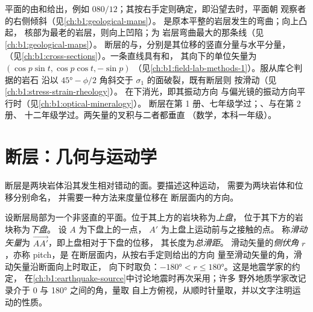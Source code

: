 \begin{recall}
平面的由和给出，例如
$080/12$；其按右手定则确定，即沿望去时，平面朝
观察者的右侧倾斜（见\cref{ch:b1:geological-maps}）。
是原本平整的岩层发生的弯曲；向上凸起，
核部为最老的岩层，则向上凹陷；为
岩层弯曲最大的那条线（见\cref{ch:b1:geological-maps}）。
断层的与，分别是其位移的竖直分量与水平分量，
（见\cref{ch:b1:cross-sections}）。一条直线具有和，
其向下的单位矢量为 $(\cos p\sin t, \cos p\cos t, -\sin p)$
（见\cref{ch:b1:field-lab-methods-1}）。服从库仑判据的岩石
沿以 $\ang{45} - \phi/2$ 角斜交于 $\sigma_1$ 的面破裂，既有断层则
按滑动（见\cref{ch:b1:stress-strain-rheology}）。
在下消光，即其振动方向
与偏光镜的振动方向平行时（见\cref{ch:b1:optical-mineralogy}）。
断层在第 1 册、七年级学过；、与在第 2 册、
十二年级学过。两矢量的叉积与二者都垂直
（数学，本科一年级）。
\end{recall}

\section{断层：几何与运动学}\label{sec:b1:faults-folds-fabrics:faults}

断层是两块岩体沿其发生相对错动的面。要描述这种运动，
需要为两块岩体和位移分别命名，
并需要一种方法来度量位移在
断层面内的方向。

\begin{definition}\label{def:b1:faults-folds-fabrics:fault-elements}
设断层局部为一个非竖直的平面。位于其上方的岩块称为\emph{上盘}，
位于其下方的岩块称为\emph{下盘}。
设 $A$ 为下盘上的一点，
$A'$ 为上盘上运动前与之接触的点。
称\emph{滑动矢量}为
$\overrightarrow{AA'}$，即上盘相对于下盘的位移，
其长度为\emph{总滑距}。
滑动矢量的\emph{侧伏角} $r$，亦称 pitch，是
在断层面内，从按右手定则给出的方向
量至滑动矢量的角，滑动矢量沿断面向上时取正，
向下时取负：$\ang{-180} < r \le \ang{180}$。这是地震学家的约定，
在\cref{ch:b1:earthquake-source}中讨论地震时再次采用；许多
野外地质学家改记录介于 0 与 \ang{180} 之间的角，量取
自上方俯视，从顺时针量取，并以文字注明运动的性质。
\end{definition}

